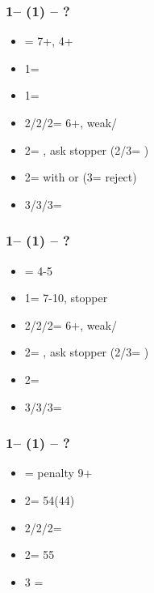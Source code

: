 \documentclass[12pt, a4paper]{report}
\begin{document}
{{{            \subsubsection*{1\clubs -- (1\hearts) -- ?}
            \begin{itemize}
                \item \dbl = 7+, 4+\spades
                \item 1\spades = \nt
                \item 1\nt = \inv
                \item 2\clubs/2\hearts/2\spades = \trsf{\diams/\spades/\clubs} 6+, weak/\gf
                \item 2\diams = \invp, ask stopper (2\nt/3\clubs = \nf)
                \item 2\nt = \inv with \clubs or \diams (3\clubs = reject)
                \item 3\clubs/3\diams/3\spades = \inv
            \end{itemize}

            \subsubsection*{1\clubs -- (1\spades) -- ?}
            \begin{itemize}
                \item \dbl = 4-5\hearts
                \item 1\nt = 7-10, \spades stopper
                \item 2\clubs/2\diams/2\spades = \trsf{\diams/\hearts/\clubs} 6+, weak/\gf
                \item 2\hearts = \invp, ask stopper (2\nt/3\clubs = \nf)
                \item 2\nt = \inv
                \item 3\clubs/3\diams/3\hearts = \inv
            \end{itemize}

            \subsubsection*{1\clubs -- (1\nt) -- ?}
            \begin{itemize}
                \item \dbl = penalty 9+
                \item 2\clubs = 54\major (44)
                \item 2\diams/2\hearts/2\spades = \nf
                \item 2\nt = 55\minor
                \item 3 = \inv\ \unbal
            \end{itemize}

}}}
\end{document}

